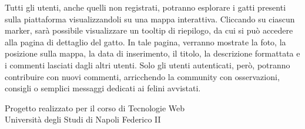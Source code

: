 \documentclass[10pt,a4paper]{article}
\begin{document}
Tutti gli utenti, anche quelli non registrati, potranno esplorare i gatti presenti sulla piattaforma visualizzandoli su una mappa interattiva. Cliccando su ciascun marker, sarà possibile visualizzare un tooltip di riepilogo, da cui si può accedere alla pagina di dettaglio del gatto. In tale pagina, verranno mostrate la foto, la posizione sulla mappa, la data di inserimento, il titolo, la descrizione formattata e i commenti lasciati dagli altri utenti. Solo gli utenti autenticati, però, potranno contribuire con nuovi commenti, arricchendo la community con osservazioni, consigli o semplici messaggi dedicati ai felini avvistati.

\vspace{1.5cm}

\begin{center}
{\small\textcolor{dark}{Progetto realizzato per il corso di Tecnologie Web}} \\
{\small\textcolor{dark}{Università degli Studi di Napoli Federico II}}
\end{center}
\end{document}
